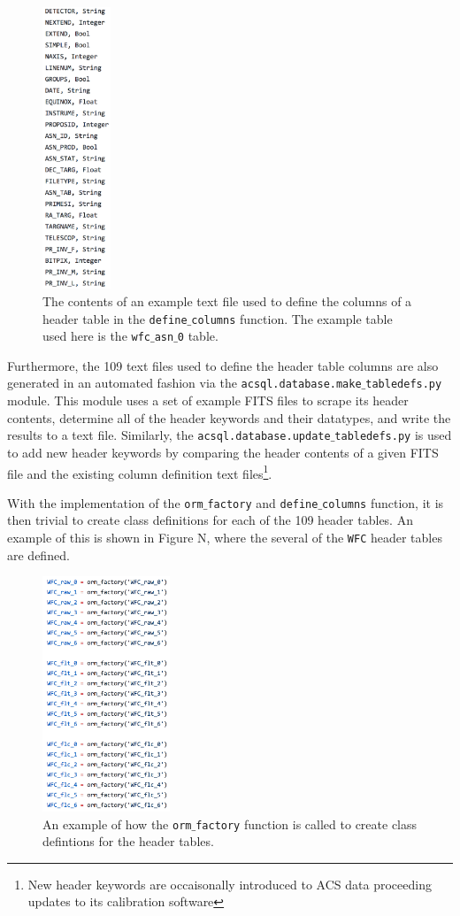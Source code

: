 \documentclass[10pt,journal,compsoc]{IEEEtran}
\begin{document}
\begin{figure}[!t]
\centering
\includegraphics[width=0.8in]{./figures/table_definition.png}
\caption{The contents of an example text file used to define the columns of a header table in the
\texttt{define$\_$columns} function. The example table used here is the \texttt{wfc$\_$asn$\_$0} table.}
\label{fig1}
\end{figure}

Furthermore, the 109 text files used to define the header table columns are also generated in an
automated fashion via the \texttt{acsql.database.make$\_$tabledefs.py} module.  This module uses
a set of example FITS files to scrape its header contents, determine all of the header keywords and
their datatypes, and write the results to a text file.  Similarly, the
\texttt{acsql.database.update$\_$tabledefs.py} is used to add new header keywords by comparing the
header contents of a given FITS file and the existing column definition text files\footnote{New header
keywords are occaisonally introduced to ACS data proceeding updates to its calibration software}.

With the implementation of the \texttt{orm$\_$factory} and \texttt{define$\_$columns} function, it is
then trivial to create class definitions for each of the 109 header tables.  An example of this is
shown in Figure N, where the several of the \texttt{WFC} header tables are defined.

\begin{figure}[!t]
\centering
\includegraphics[width=1.5in]{./figures/orm_factory_calls.png}
\caption{An example of how the \texttt{orm$\_$factory} function is called to create class
defintions for the header tables.}
\label{fig1}
\end{figure}
\end{document}
